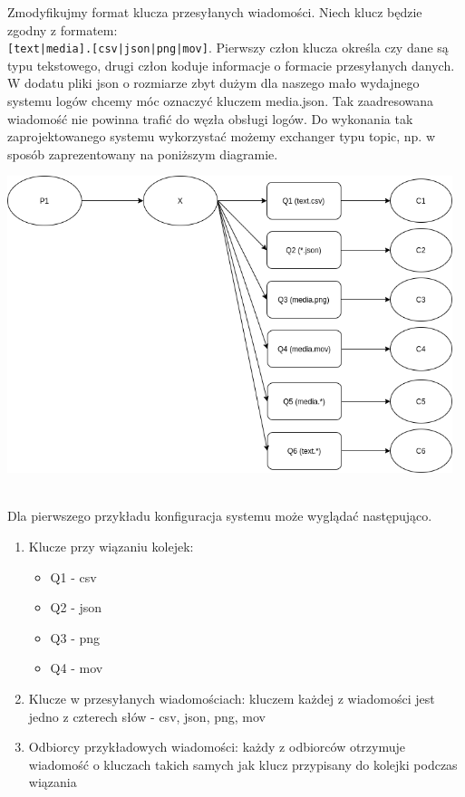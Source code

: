 \documentclass{article}
\begin{document}
        Zmodyfikujmy format klucza przesyłanych wiadomości. Niech klucz będzie zgodny z formatem:\\ \texttt{[text|media].[csv|json|png|mov]}. Pierwszy człon klucza określa czy dane są typu tekstowego, drugi człon koduje informacje o formacie przesyłanych danych.\\
        W dodatu pliki json o rozmiarze zbyt dużym dla naszego mało wydajnego systemu logów chcemy móc oznaczyć kluczem media.json. Tak zaadresowana wiadomość nie powinna trafić do węzła obsługi logów.
        Do wykonania tak zaprojektowanego systemu wykorzystać możemy exchanger typu topic, np. w sposób zaprezentowany na poniższym diagramie. 
        \begin{center}
            \includegraphics[width=13cm]{lab2/report/ex3_2.png}
        \end{center}\\
        Dla pierwszego przykładu konfiguracja systemu może wyglądać następująco. 
        \begin{enumerate}
            \item Klucze przy wiązaniu kolejek: \begin{itemize}
                \item Q1 - csv
                \item Q2 - json
                \item Q3 - png
                \item Q4 - mov
                \end{itemize}
            \item Klucze w przesyłanych wiadomościach: kluczem każdej z wiadomości jest jedno z czterech słów - csv, json, png, mov
            \item Odbiorcy przykładowych wiadomości: każdy z odbiorców otrzymuje wiadomość o kluczach takich samych jak klucz przypisany do kolejki podczas wiązania
        \end{enumerate}
\end{document}
